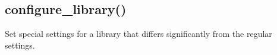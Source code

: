 \documentclass[letterpaper,10pt,english]{sphinxmanual}
\begin{document}
\subsection{configure\_library()}
\label{\detokenize{api:configure-library}}
\sphinxAtStartPar
Set special settings for a library that differs significantly from the regular settings.

\begin{sphinxVerbatim}[commandchars=\\\{\}]
  
\end{sphinxVerbatim}
\end{document}
